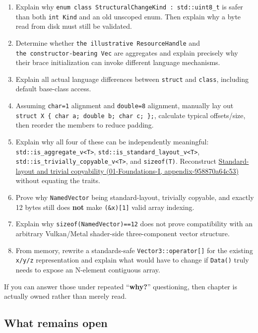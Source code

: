 \begin{enumerate}
\item
  Explain why \texttt{enum\ class\ StructuralChangeKind\ :\ std::uint8\_t} is safer than both \texttt{int\ Kind} and an old unscoped enum. Then explain why a byte read from disk must still be validated.
\item
  Determine whether \texttt{the\ illustrative\ ResourceHandle} and \texttt{the\ constructor-bearing\ Vec} are aggregates and explain precisely why their brace initialization can invoke different language mechanisms.
\item
  Explain all actual language differences between \texttt{struct} and \texttt{class}, including default base-class access.
\item
  Assuming \texttt{char=1} alignment and \texttt{double=8} alignment, manually lay out \texttt{struct\ X\ \{\ char\ a;\ double\ b;\ char\ c;\ \};}, calculate typical offsets/size, then reorder the members to reduce padding.
\item
  Explain why all four of these can be independently meaningful: \texttt{std::is\_aggregate\_v\textless{}T\textgreater{}}, \texttt{std::is\_standard\_layout\_v\textless{}T\textgreater{}}, \texttt{std::is\_trivially\_copyable\_v\textless{}T\textgreater{}}, and \texttt{sizeof(T)}. Reconstruct \href{}{Standard-layout and trivial copyability (01-Foundations-I, appendix-958870a64c53)} without equating the traits.
\item
  Prove why \texttt{NamedVector} being standard-layout, trivially copyable, and exactly 12 bytes still does \textbf{not} make \texttt{(\&x){[}1{]}} valid array indexing.
\item
  Explain why \texttt{sizeof(NamedVector)==12} does not prove compatibility with an arbitrary Vulkan/Metal shader-side three-component vector structure.
\item
  From memory, rewrite a standards-safe \texttt{Vector3::operator{[}{]}} for the existing \texttt{x/y/z} representation and explain what would have to change if \texttt{Data()} truly needs to expose an N-element contiguous array.
\end{enumerate}

If you can answer those under repeated ``\textbf{why?}'' questioning, then chapter is actually owned rather than merely read.

\subsection{What remains open}\label{what-remains-open}

